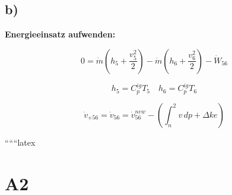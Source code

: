 

\subsection*{b)}

\textbf{Energieeinsatz aufwenden:}

\[
0 = \dot{m} \left( h_5 + \frac{v_5^2}{2} \right) - \dot{m} \left( h_6 + \frac{v_6^2}{2} \right) - \dot{W}_{56}
\]

\[
h_5 = C_p^{ig} T_5 \quad h_6 = C_p^{ig} T_6
\]

\[
\dot{v}_{+56} = \dot{v}_{56} = \dot{v}_{56}^{new} - \left( \int_{n}^{2} v \, dp + \Delta ke \right)
\]

``````latex


\section*{A2}